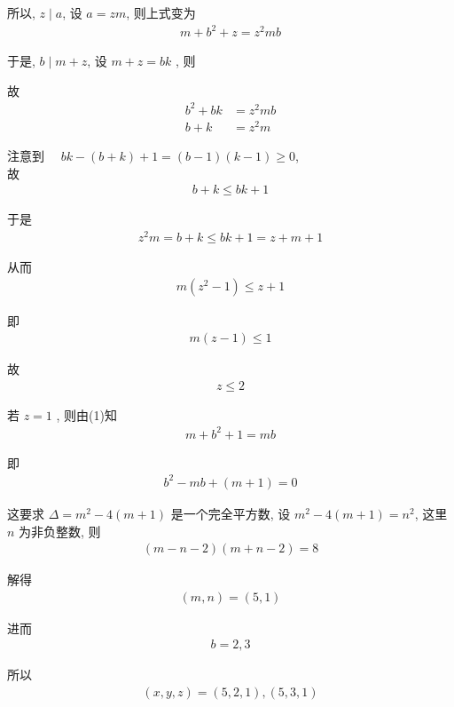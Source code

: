 所以, $z \mid a$, 设 $a=z m$, 则上式变为
\begin{align*}
	m+b^{2}+z=z^{2} m b
\end{align*}

于是, $b \mid m+z$, 设 $m+z=b k$ , 则

故\begin{align}
	b^{2}+b k & =z^{2} m b \\
	b+k       & =z^{2} m
\end{align}

注意到 $\quad b k-(b+k)+1=(b-1)(k-1) \geqslant 0$,\\
故
\begin{align*}
	b+k \leqslant b k+1
\end{align*}

于是
\begin{align*}
	z^{2} m=b+k \leqslant b k+1=z+m+1
\end{align*}

从而
\begin{align*}
	m\left(z^{2}-1\right) \leqslant z+1
\end{align*}

即
\begin{align*}
	m(z-1) \leqslant 1
\end{align*}

故
\begin{align*}
	z \leqslant 2
\end{align*}

若 $z=1$ , 则由(1)知
\begin{align*}
	m+b^{2}+1=m b
\end{align*}

即
\begin{align*}
	b^{2}-m b+(m+1)=0
\end{align*}

这要求 $\Delta=m^{2}-4(m+1)$ 是一个完全平方数, 设 $m^{2}-4(m+1)=n^{2}$, 这里 $n$ 为非负整数, 则
\begin{align*}
	(m-n-2)(m+n-2)=8
\end{align*}

解得
\begin{align*}
	(m, n)=(5,1)
\end{align*}

进而
\begin{align*}
	b=2,3
\end{align*}

所以
\begin{align*}
	(x, y, z)=(5,2,1),(5,3,1)
\end{align*}

